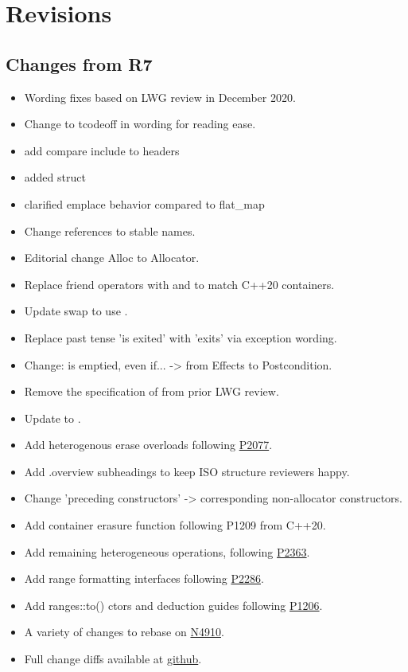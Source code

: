 \section{Revisions}

\subsection{Changes from R7}

\begin{itemize}
  \item Wording fixes based on LWG review in December 2020.
  \item Change  to tcode{off} in wording for reading ease.
  \item add compare include to headers
  \item added  struct
  \item clarified  emplace behavior compared to {flat_map}
  \item Change references to stable names.
  \item Editorial change Alloc to Allocator.
  \item Replace friend operators with  and  to match C++20 containers.
  \item Update swap to use .
  \item Replace past tense 'is exited' with 'exits' via exception wording.
  \item {} Change:  is emptied, even if...  -> from Effects to Postcondition.
  \item Remove the specification of  from prior LWG review.
  \item Update  to .
  \item Add heterogenous erase overloads following \href{https://wg21.link/P2077}{P2077}.
  \item Add .overview subheadings to keep ISO structure reviewers happy.
  \item Change 'preceding constructors' -> corresponding non-allocator constructors.
  \item Add container erasure  function following P1209 from C++20.
  \item Add remaining heterogeneous operations, following \href{https://wg21.link/P2363}{P2363}.
  \item Add range formatting interfaces following \href{https://wg21.link/P2286}{P2286}.
  \item Add ranges::to() ctors and deduction guides following \href{https://wg21.link/P1206}{P1206}.
  \item A variety of changes to rebase on \href{https://wg21.link/N4910}{N4910}.
  \item Full change diffs available at \href{https://github.com/tzlaine/flat_map/commits/master}{github}.
\end{itemize}

